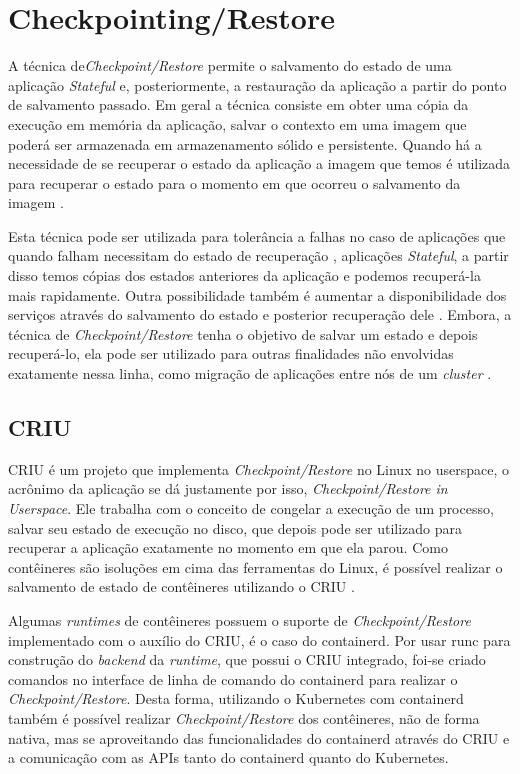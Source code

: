 \section{Checkpointing/Restore}

A técnica de\textit{Checkpoint/Restore} permite o salvamento do estado de
uma aplicação \textit{Stateful} e, posteriormente, a restauração da
aplicação a partir do ponto de salvamento passado. Em geral a técnica
consiste em obter uma cópia da execução em memória da aplicação, salvar o
contexto em uma imagem que poderá ser armazenada em armazenamento sólido e
persistente. Quando há a necessidade de se recuperar o estado da aplicação
a imagem que temos é utilizada para recuperar o estado para o momento em
que ocorreu o salvamento da imagem \cite{laadan2010linux}.

Esta técnica pode ser utilizada para tolerância a falhas no caso de aplicações
que quando falham necessitam do estado de recuperação \cite{muller2022architecture}
\cite{Chen2015/10}, aplicações \textit{Stateful}, a partir disso temos cópias
dos estados anteriores da aplicação e podemos recuperá-la mais rapidamente.
Outra possibilidade também é aumentar a disponibilidade dos serviços através
do salvamento do estado e posterior recuperação dele \cite{vayghan2021kubernetes}.
Embora, a técnica de \textit{Checkpoint/Restore} tenha o objetivo de salvar um
estado e depois recuperá-lo, ela pode ser utilizado para outras finalidades não
envolvidas exatamente nessa linha, como migração de aplicações entre nós de um
\textit{cluster} \cite{Chen2015/10}.

\subsection{CRIU}

CRIU é um projeto que implementa \textit{Checkpoint/Restore} no Linux no
userspace, o acrônimo da aplicação se dá justamente por isso,
\textit{Checkpoint/Restore in Userspace}. Ele trabalha com o conceito de
congelar a execução de um processo, salvar seu estado de execução no disco,
que depois pode ser utilizado para recuperar a aplicação exatamente no
momento em que ela parou. Como contêineres são isoluções em cima das
ferramentas do Linux, é possível realizar o salvamento de estado de
contêineres utilizando o CRIU \cite{criu}.

Algumas \textit{runtimes} de contêineres possuem o suporte de
\textit{Checkpoint/Restore} implementado com o auxílio do CRIU, é o caso
do containerd. Por usar runc para construção do \textit{backend} da
\textit{runtime}, que possui o CRIU integrado, foi-se criado comandos no
interface de linha de comando do containerd para realizar o
\textit{Checkpoint/Restore}. Desta forma, utilizando o Kubernetes com
containerd também é possível realizar \textit{Checkpoint/Restore} dos
contêineres, não de forma nativa, mas se aproveitando das funcionalidades
do containerd através do CRIU e a comunicação com as APIs tanto do containerd
quanto do Kubernetes.

